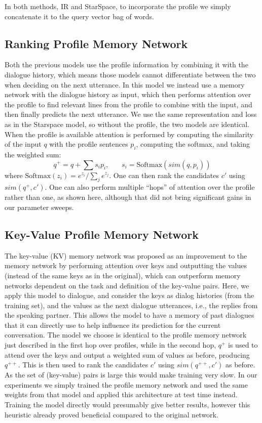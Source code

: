 \documentclass[11pt,a4paper]{article}
\begin{document}
In both methods, IR and StarSpace, to incorporate the profile we simply concatenate it to the query vector bag of words. 
\fi

\subsection{Ranking Profile Memory Network}

Both the previous models use the profile information by combining it 
with the dialogue history, which means those models cannot differentiate between the two when deciding on the next utterance. In this model we instead use a memory network with the dialogue history as input, which then performs attention over the profile to find relevant lines from the profile to combine with the input, and then finally predicts the next utterance. We use the same representation and loss as in the Starspace model, so without the profile, the two models are identical.
When the profile is available attention is performed by computing the similarity of the input $q$ with the profile sentences $p_i$, computing the softmax, and taking the weighted sum:
\[
   q^+ = q + \sum s_i p_i,  ~~~~~~~~ s_i = {\mbox{Softmax}}(sim(q, p_i))
\]
where ${\mbox{Softmax}}(z_i) = e^{z_i}/\sum_j e^{z_j}$.
One can then rank the candidates $c'$ using $sim(q^+,c')$.
One can also perform multiple ``hops'' of attention over the profile rather than one, as shown here, although that did not bring significant gains in our parameter sweeps. 



\subsection{Key-Value Profile Memory Network}\label{sec:kvmem}

The key-value (KV) memory network \cite{miller2016key} was proposed as an improvement to the memory network by performing attention over keys and outputting the values (instead of the same keys as in the original), which can outperform memory networks dependent on the task and definition of the key-value pairs. Here, we apply this model to dialogue, and consider the keys as dialog histories (from the training set), and the values as the next dialogue utterances, i.e., the replies from the speaking partner. 
This allows the model to have a memory of past dialogues that it can directly use to help influence its prediction for the current conversation. 
The model we choose is identical to the profile memory network just described in the first hop over profiles, while in the second hop, $q^+$ is used to attend over the keys and output a weighted sum of values as before, producing 
$q^{++}$. This is then used to rank the candidates $c'$  using $sim(q^{++},c')$ as before.  As the set of (key-value) pairs is large this would make training very slow. In our experiments we simply trained the profile memory network and used the same weights from that model and applied this architecture at test time instead. Training the model directly would presumably give better results, however this heuristic already proved beneficial compared to the original network. 
\end{document}
